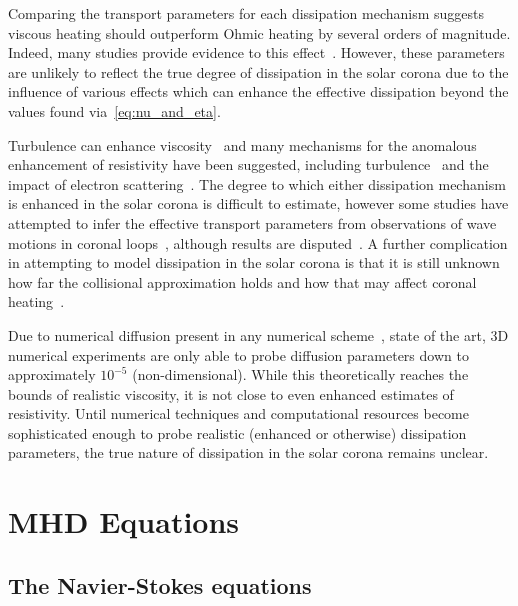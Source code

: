 Comparing the transport parameters for each dissipation mechanism suggests viscous heating should outperform Ohmic heating by several orders of magnitude. Indeed, many studies provide evidence to this effect~\cite{browningMechanismsSolarCoronal1991,craigViscousDissipation3D2013,craigAnisotropicViscousDissipation2009a,armstrongViscoResistiveDissipation2013,hollwegViscosityChewGoldbergerLowEquations1986a}. However, these parameters are unlikely to reflect the true degree of dissipation in the solar corona due to the influence of various effects which can enhance the effective dissipation beyond the values found via~\ref{eq:nu_and_eta}. 

Turbulence can enhance viscosity~\cite{canutoTurbulentViscosity1988} and many mechanisms for the anomalous enhancement of resistivity have been suggested, including turbulence~\cite{cheHowAnomalousResistivity2017} and the impact of electron scattering~\cite{maEffectiveResistivityCollisionless2018}. The degree to which either dissipation mechanism is enhanced in the solar corona is difficult to estimate, however some studies have attempted to infer the effective transport parameters from observations of wave motions in coronal loops~\cite{nakariakovTRACEObservationDamped1999}, although results are disputed~\cite{klimchukCoronalSeismologyPropagation2004}. A further complication in attempting to model dissipation in the solar corona is that it is still unknown how far the collisional approximation holds and how that may affect coronal heating~\cite{klimchukSolvingCoronalHeating2006a}.

Due to numerical diffusion present in any numerical scheme~\cite{ferzigerComputationalMethodsFluid2002}, state of the art, 3D numerical experiments are only able to probe diffusion parameters down to approximately $10^{-5}$ (non-dimensional). While this theoretically reaches the bounds of realistic viscosity, it is not close to even enhanced estimates of resistivity. Until numerical techniques and computational resources become sophisticated enough to probe realistic (enhanced or otherwise) dissipation parameters, the true nature of dissipation in the solar corona remains unclear.

\section{MHD Equations}

\subsection{The Navier-Stokes equations}

